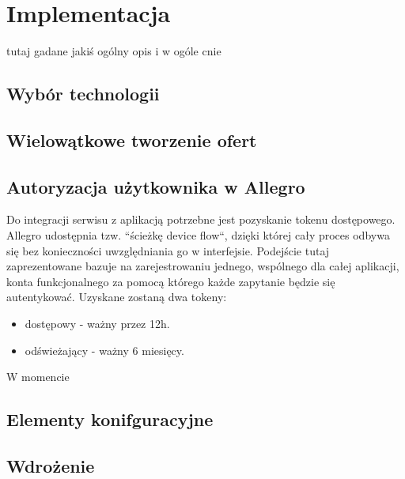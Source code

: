 \chapter{Implementacja}
\label{cha:implementacja}

tutaj gadane jakiś ogólny opis i w ogóle cnie


\section{Wybór technologii}


\section{Wielowątkowe tworzenie ofert}


\section{Autoryzacja użytkownika w Allegro}

Do integracji serwisu z aplikacją potrzebne jest pozyskanie tokenu dostępowego. Allegro udostępnia tzw. ``ścieżkę device flow``, dzięki której cały proces odbywa się bez konieczności uwzględniania go w interfejsie. Podejście tutaj zaprezentowane bazuje na zarejestrowaniu jednego, wspólnego dla całej aplikacji, konta funkcjonalnego za pomocą którego każde zapytanie będzie się autentykować. Uzyskane zostaną dwa tokeny: 
\begin{itemize}
	\item dostępowy - ważny przez 12h.
	\item odświeżający - ważny 6 miesięcy.
\end{itemize}
W momencie 



\section{Elementy konifguracyjne}


\section{Wdrożenie}

